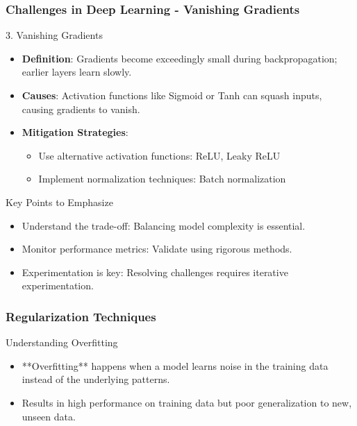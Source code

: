 \documentclass[aspectratio=169]{beamer}
\begin{document}
\begin{frame}[fragile]
  \frametitle{Challenges in Deep Learning - Vanishing Gradients}
  \begin{block}{3. Vanishing Gradients}
      \begin{itemize}
          \item \textbf{Definition}: Gradients become exceedingly small during backpropagation; earlier layers learn slowly.
          \item \textbf{Causes}: Activation functions like Sigmoid or Tanh can squash inputs, causing gradients to vanish.
          \item \textbf{Mitigation Strategies}:
          \begin{itemize}
              \item Use alternative activation functions: ReLU, Leaky ReLU
              \item Implement normalization techniques: Batch normalization
          \end{itemize}
      \end{itemize}
  \end{block}

  \begin{block}{Key Points to Emphasize}
      \begin{itemize}
          \item Understand the trade-off: Balancing model complexity is essential.
          \item Monitor performance metrics: Validate using rigorous methods.
          \item Experimentation is key: Resolving challenges requires iterative experimentation.
      \end{itemize}
  \end{block}
\end{frame}

\begin{frame}[fragile]
    \frametitle{Regularization Techniques}
    \begin{block}{Understanding Overfitting}
        \begin{itemize}
            \item **Overfitting** happens when a model learns noise in the training data instead of the underlying patterns.
            \item Results in high performance on training data but poor generalization to new, unseen data.
        \end{itemize}
    \end{block}
\end{frame}
\end{document}
